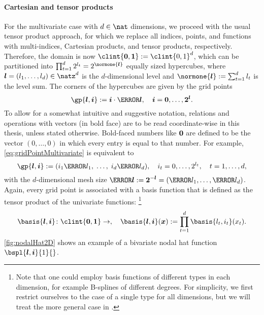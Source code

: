 \paragraph{Cartesian and tensor products}

For the multivariate case with $d \in \nat$ dimensions,
we proceed with the usual tensor product approach,
for which we replace all indices, points, and functions with
multi-indices, Cartesian products, and tensor products, respectively.
Therefore, the domain is now $\clint{\*0, \*1} := \clint{0, 1}^d$,
which can be partitioned into
$\prod_{t=1}^d 2^{l_t} = 2^{\normone{\vec{l}}}$ equally sized hypercubes,
where $\*l = (l_1, \dotsc, l_d) \in \natz^d$ is the $d$-dimensional level
and $\normone{\vec{l}} := \sum_{t=1}^d l_t$ is the level sum.
The corners of the hypercubes are given by the grid points
\begin{equation}
  \label{eq:gridPointMultivariate}
  \gp{\*l,\*i} := \*i \cdot \ms{\*l},\quad
  \*i = \*0, \dotsc, \*2^{\*l}.
\end{equation}
To allow for a somewhat intuitive and suggestive notation,
relations and operations with vectors (in bold face)
are to be read coordinate-wise in this thesis, unless stated otherwise.
Bold-faced numbers like ${\boldsymbol{0}}$ are defined to be the vector $(0, \dotsc, 0)$
in which every entry is equal to that number.
For example, \eqref{eq:gridPointMultivariate} is equivalent to
\begin{equation}
  \gp{\*l,\*i}
  := (i_1 \ms{l_1},\; \dotsc,\; i_d \ms{l_d}),\quad
  i_t = 0, \dotsc, 2^{l_t},\quad
  t = 1, \dotsc, d,
\end{equation}
with the $d$-dimensional mesh size
$\ms{\*l} := \*2^{-\*l} = (\ms{l_1}, \dotsc, \ms{l_d})$.
Again, every grid point is associated with a basis function that is defined
as the tensor product of the univariate functions:%
\footnote{%
  Note that one could employ basis functions of different types in
  each dimension, for example B-splines of different degrees.
  For simplicity, we first restrict ourselves to the case of a single type
  for all dimensions, but we will treat the more general case in
  .%
}
\begin{equation}
  \basis{\*l,\*i}\colon \clint{\*0, \*1} \to \real,\quad
  \basis{\*l,\*i}(\*x)
  := \prod_{t=1}^d \basis{l_t,i_t}(x_t).
\end{equation}
\cref{fig:nodalHat2D} shows an example of a bivariate nodal hat function
$\bspl{\*l,\*i}{1}{}$.

